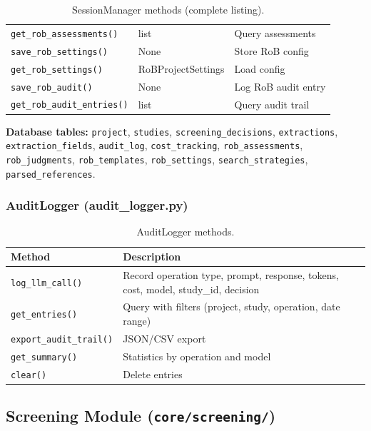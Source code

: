 \documentclass[11pt,a4paper]{article}
\begin{document}
\begin{table}[H]
\begin{tabular}{p{5cm}p{3.5cm}p{4.5cm}}
\texttt{get\_rob\_assessments()} & list & Query assessments \\
\texttt{save\_rob\_settings()} & None & Store RoB config \\
\texttt{get\_rob\_settings()} & RoBProjectSettings & Load config \\
\texttt{save\_rob\_audit()} & None & Log RoB audit entry \\
\texttt{get\_rob\_audit\_entries()} & list & Query audit trail \\
\bottomrule
\end{tabular}
\caption{SessionManager methods (complete listing).}
\end{table}

\textbf{Database tables:} \texttt{project}, \texttt{studies}, \texttt{screening\_decisions}, \texttt{extractions}, \texttt{extraction\_fields}, \texttt{audit\_log}, \texttt{cost\_tracking}, \texttt{rob\_assessments}, \texttt{rob\_judgments}, \texttt{rob\_templates}, \texttt{rob\_settings}, \texttt{search\_strategies}, \texttt{parsed\_references}.

\subsubsection{AuditLogger (audit\_logger.py)}

\begin{table}[H]
\centering\small
\begin{tabular}{p{4cm}p{9cm}}
\toprule
\textbf{Method} & \textbf{Description} \\
\midrule
\texttt{log\_llm\_call()} & Record operation type, prompt, response, tokens, cost, model, study\_id, decision \\
\texttt{get\_entries()} & Query with filters (project, study, operation, date range) \\
\texttt{export\_audit\_trail()} & JSON/CSV export \\
\texttt{get\_summary()} & Statistics by operation and model \\
\texttt{clear()} & Delete entries \\
\bottomrule
\end{tabular}
\caption{AuditLogger methods.}
\end{table}

\subsection{Screening Module (\texttt{core/screening/})}
\end{document}
